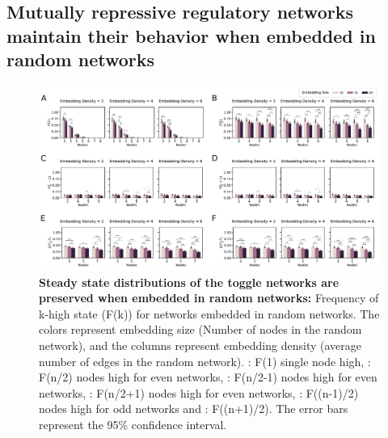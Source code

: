 \documentclass[11pt,a4paper]{article}
\theoremstyle{definition}
\theoremstyle{remark}
\begin{document}
\subsection{Mutually repressive regulatory networks maintain their behavior when embedded in random networks}
\begin{figure}[!ht]
    \centering
    \begin{subfigure}[c]{\textwidth}
        \label{F1-emb}
    \end{subfigure}
    \begin{subfigure}[c]{\textwidth}
        \label{Fn2-emb}
    \end{subfigure}
    \begin{subfigure}[c]{\textwidth}
        \label{Fn2-1-emb}
    \end{subfigure}
    \begin{subfigure}[c]{\textwidth}
        \label{Fn2+1-emb}
    \end{subfigure}
    \begin{subfigure}[c]{\textwidth}
        \label{Fn-12-emb}
    \end{subfigure}
    \begin{subfigure}[c]{\textwidth}
        \label{Fn+12-emb}
    \end{subfigure}
    \includegraphics[width=\textwidth]{figures/Figure4}
    \caption{\textbf{Steady state distributions of the toggle networks are preserved when embedded in random networks:} Frequency of k-high state (F(k)) for networks embedded in random networks. The colors represent embedding size (Number of nodes in the random network), and the columns represent embedding density (average number of edges in the random network). : F(1) single node high, : F(n/2) nodes high for even networks, : F(n/2-1) nodes high for even networks, : F(n/2+1) nodes high for even networks, : F((n-1)/2) nodes high for odd networks and : F((n+1)/2). The error bars represent the 95\% confidence interval.}
    \label{embedded}
\end{figure}
\end{document}
